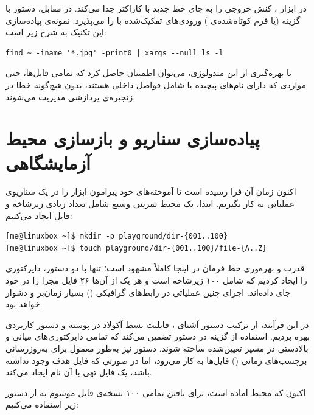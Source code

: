 در ابزار ، کنش  خروجی را به جای خط جدید با کاراکتر  جدا می‌کند. در مقابل، دستور  با گزینه  (یا فرم کوتاه‌شده‌ی ) ورودی‌های تفکیک‌شده با  را می‌پذیرد. نمونه‌ی پیاده‌سازی این تکنیک به شرح زیر است:

\begin{latin}
\begin{lstlisting}
find ~ -iname '*.jpg' -print0 | xargs --null ls -l
\end{lstlisting}
\end{latin}

با بهره‌گیری از این متدولوژی، می‌توان اطمینان حاصل کرد که تمامی فایل‌ها، حتی مواردی که دارای نام‌های پیچیده یا شامل فواصل داخلی هستند، بدون هیچ‌گونه خطا در زنجیره‌ی پردازشی مدیریت می‌شوند.

\section{پیاده‌سازی سناریو و بازسازی محیط آزمایشگاهی}

اکنون زمان آن فرا رسیده است تا آموخته‌های خود پیرامون ابزار  را در یک سناریوی عملیاتی به کار بگیریم. ابتدا، یک محیط تمرینی وسیع شامل تعداد زیادی زیرشاخه و فایل ایجاد می‌کنیم:

\begin{latin}
\begin{lstlisting}
[me@linuxbox ~]$ mkdir -p playground/dir-{001..100}
[me@linuxbox ~]$ touch playground/dir-{001..100}/file-{A..Z}
\end{lstlisting}
\end{latin}

قدرت و بهره‌وری خط فرمان در اینجا کاملاً مشهود است؛ تنها با دو دستور، دایرکتوری  را ایجاد کردیم که شامل ۱۰۰ زیرشاخه است و هر یک از آن‌ها ۲۶ فایل مجزا را در خود جای داده‌اند. اجرای چنین عملیاتی در رابط‌های گرافیکی () بسیار زمان‌بر و دشوار خواهد بود.

در این فرآیند، از ترکیب دستور آشنای ، قابلیت بسط آکولاد  در پوسته و دستور کاربردی  بهره بردیم. استفاده از گزینه  در دستور  تضمین می‌کند که تمامی دایرکتوری‌های میانی و بالادستی در مسیر تعیین‌شده ساخته شوند. دستور  نیز به‌طور معمول برای به‌روزرسانی برچسب‌های زمانی () فایل‌ها به کار می‌رود، اما در صورتی که فایل هدف وجود نداشته باشد، یک فایل تهی با آن نام ایجاد می‌کند.

اکنون که محیط آماده است، برای یافتن تمامی ۱۰۰ نسخه‌ی فایل موسوم به  از دستور زیر استفاده می‌کنیم:

